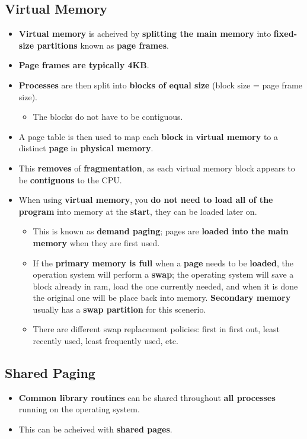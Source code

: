 \documentclass{article}
\begin{document}
    \subsection*{Virtual Memory}
    \begin{itemize}
        \item \textbf{Virtual memory} is acheived by \textbf{splitting the main memory} into \textbf{fixed-size partitions} known as \textbf{page frames}.
        \item \textbf{Page frames are typically 4KB}.
        \item \textbf{Processes} are then split into \textbf{blocks of equal size} (block size = page frame size).
        \begin{itemize}
            \item The blocks do not have to be contiguous.
        \end{itemize}
        \item A page table is then used to map each \textbf{block} in \textbf{virtual memory} to a distinct \textbf{page} in \textbf{physical memory}.
        \item This \textbf{removes} of \textbf{fragmentation}, as each virtual memory block appears to be \textbf{contiguous} to the CPU.
        \item When using \textbf{virtual memory}, you \textbf{do not need to load all of the program} into memory at the \textbf{start}, they can be loaded later on.
        \begin{itemize}
            \item This is known as \textbf{demand paging}; pages are \textbf{loaded into the main memory} when they are first used.
            \item If the \textbf{primary memory is full} when a \textbf{page} needs to be \textbf{loaded}, the operation system will perform a \textbf{swap}; the operating system will save a block already in ram, load the one currently needed, and when it is done the original one will be place back into memory. \textbf{Secondary memory} usually has a \textbf{swap partition} for this scenerio.
            \item There are different swap replacement policies: first in first out, least recently used, least frequently used, etc. 
        \end{itemize}
    \end{itemize}

    \subsection*{Shared Paging}
    \begin{itemize}
        \item \textbf{Common library routines} can be shared throughout \textbf{all processes} running on the operating system.
        \item This can be acheived with \textbf{shared pages}.
    \end{itemize}
\end{document}
